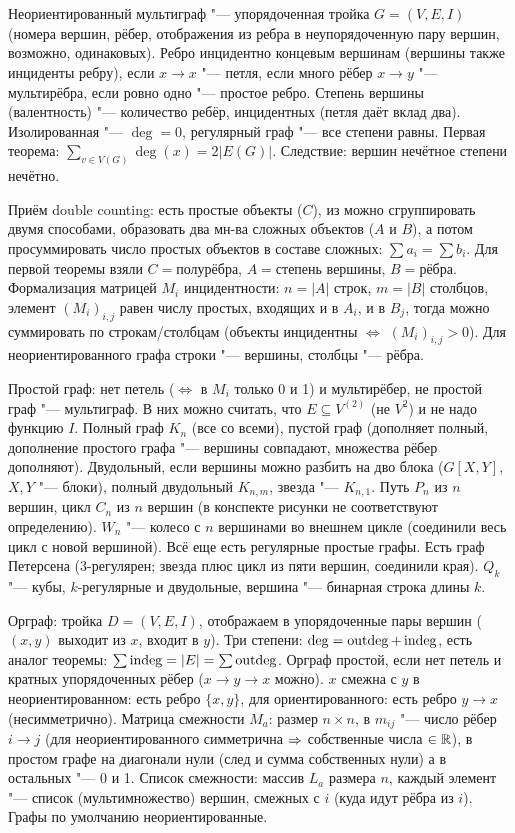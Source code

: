 \section{} %
Неориентированный мультиграф "--- упорядоченная тройка $G=(V, E, I)$ (номера вершин, рёбер, отображения из ребра в неупорядоченную пару вершин, возможно, одинаковых).
Ребро инцидентно концевым вершинам (вершины также инциденты ребру), если $x \to x$ "--- петля, если много рёбер $x \to y$ "--- мультирёбра,
если ровно одно "--- простое ребро.
Степень вершины (валентность) "--- количество ребёр, инцидентных (петля даёт вклад два).
Изолированная "--- $\deg = 0$, регулярный граф "--- все степени равны.
Первая теорема: $\sum_{v \in V(G)} \deg(x) = 2|E(G)|$.
Следствие: вершин нечётное степени нечётно.

Приём double counting: есть простые объекты ($C$), из можно сгруппировать двумя способами, образовать два мн-ва сложных объектов ($A$ и $B$),
а потом просуммировать число простых объектов в составе сложных: $\sum a_i = \sum b_i$.
Для первой теоремы взяли $C=\text{полурёбра}$, $A=\text{степень вершины}$, $B=\text{рёбра}$.
Формализация матрицей $M_i$ инцидентности: $n=|A|$ строк, $m=|B|$ столбцов, элемент $(M_i)_{i,j}$
равен числу простых, входящих и в $A_i$, и в $B_j$, тогда можно суммировать по строкам/столбцам
(объекты инцидентны $\iff$ $(M_i)_{i,j}>0$).
Для неориентированного графа строки "--- вершины, столбцы "--- рёбра.

Простой граф: нет петель ($\iff$ в $M_i$ только 0 и 1) и мультирёбер, не простой граф "--- мультиграф.
В них можно считать, что $E \subseteq V^{(2)}$ (не $V^2$) и не надо функцию $I$.
Полный граф $K_n$ (все со всеми), пустой граф (дополняет полный, дополнение простого графа "--- вершины совпадают, множества рёбер дополняют).
Двудольный, если вершины можно разбить на дво блока ($G[X, Y]$, $X, Y$ "--- блоки), полный двудольный $K_{n,m}$, звезда "--- $K_{n,1}$.
Путь $P_n$ из $n$ вершин, цикл $C_n$ из $n$ вершин (\TODO в конспекте рисунки не соответствуют определению).
$W_n$ "--- колесо с $n$ вершинами во внешнем цикле (соединили весь цикл с новой вершиной).
Всё еще есть регулярные простые графы.
Есть граф Петерсена (3-регулярен; звезда плюс цикл из пяти вершин, соединили края).
$Q_k$ "--- кубы, $k$-регулярные и двудольные, вершина "--- бинарная строка длины $k$.

Орграф: тройка $D=(V,E,I)$, отображаем в упорядоченные пары вершин ($(x, y)$ выходит из $x$, входит в $y$). 
Три степени: $\deg = \operatorname{outdeg} + \operatorname{indeg}$, есть аналог теоремы: $\sum \operatorname{indeg} = |E| = \sum \operatorname{outdeg}$.
Орграф простой, если нет петель и кратных упорядоченных рёбер ($x \to y \to x$ можно).
$x$ смежна с $y$ в неориентированном: есть ребро $\{x, y\}$, для ориентированного: есть ребро $y\to x$ (несимметрично).
Матрица смежности $M_a$: размер $n \times n$, в $m_{ij}$ "--- число рёбер $i\to j$ (для неориентированного симметрична $\Rightarrow$
собственные числа $\in \mathbb{R}$), в простом графе на диагонали нули (след и сумма собственных нули) а в остальных "--- 0 и 1.
Список смежности: массив $L_a$ размера $n$, каждый элемент "--- список (мультимножество) вершин, смежных с $i$ (куда идут рёбра из $i$).
Графы по умолчанию неориентированные.

